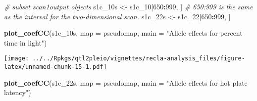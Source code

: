 \documentclass{book}
\newenvironment{Shaded}{\begin{snugshade}}{\end{snugshade}}
\newcommand{\CommentTok}[1]{\textcolor[rgb]{0.56,0.35,0.01}{\textit{#1}}}
\newcommand{\DataTypeTok}[1]{\textcolor[rgb]{0.13,0.29,0.53}{#1}}
\newcommand{\DecValTok}[1]{\textcolor[rgb]{0.00,0.00,0.81}{#1}}
\newcommand{\KeywordTok}[1]{\textcolor[rgb]{0.13,0.29,0.53}{\textbf{#1}}}
\newcommand{\NormalTok}[1]{#1}
\newcommand{\OperatorTok}[1]{\textcolor[rgb]{0.81,0.36,0.00}{\textbf{#1}}}
\newcommand{\OtherTok}[1]{\textcolor[rgb]{0.56,0.35,0.01}{#1}}
\newcommand{\StringTok}[1]{\textcolor[rgb]{0.31,0.60,0.02}{#1}}
\begin{document}
\begin{Shaded}
\end{Shaded}

\begin{Shaded}
\begin{Highlighting}[]
\CommentTok{# subset scan1output objects}
\NormalTok{s1c_10s <-}\StringTok{ }\NormalTok{s1c_}\DecValTok{10}\NormalTok{[}\DecValTok{650}\OperatorTok{:}\DecValTok{999}\NormalTok{, ] }\CommentTok{# 650:999 is the same as the interval for the two-dimensional scan.}
\NormalTok{s1c_22s <-}\StringTok{ }\NormalTok{s1c_}\DecValTok{22}\NormalTok{[}\DecValTok{650}\OperatorTok{:}\DecValTok{999}\NormalTok{, ]}
\end{Highlighting}
\end{Shaded}

\begin{Shaded}
\begin{Highlighting}[]
\KeywordTok{plot_coefCC}\NormalTok{(s1c_10s, }\DataTypeTok{map =}\NormalTok{ pseudomap, }\DataTypeTok{main =} \StringTok{"Allele effects for percent time in light"}\NormalTok{)}
\end{Highlighting}
\end{Shaded}

\texttt{[image: ../../Rpkgs/qtl2pleio/vignettes/recla-analysis\_files/figure-latex/unnamed-chunk-15-1.pdf]}

\begin{Shaded}
\begin{Highlighting}[]
\KeywordTok{plot_coefCC}\NormalTok{(s1c_22s, }\DataTypeTok{map =}\NormalTok{ pseudomap, }\DataTypeTok{main =} \StringTok{"Allele effects for hot plate latency"}\NormalTok{)}
\end{Highlighting}
\end{Shaded}
\end{document}
